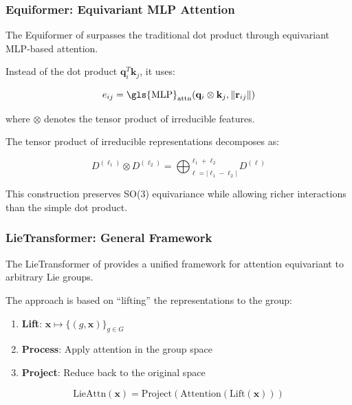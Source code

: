 \subsubsection{Equiformer: Equivariant \gls{MLP} Attention}

The Equiformer of \citet{liao2022equiformer} surpasses the traditional dot product through equivariant \gls{MLP}-based attention.

Instead of the dot product $\mathbf{q}_i^T \mathbf{k}_j$, it uses:

\begin{equation}
    e_{ij} = \text{\gls{MLP}}_{\text{attn}}(\mathbf{q}_i \otimes \mathbf{k}_j, \|\mathbf{r}_{ij}\|)
    \label{eq:equiformer_attention_scores}
\end{equation}

where $\otimes$ denotes the tensor product of irreducible features.

The tensor product of irreducible representations decomposes as:

\begin{equation}
    D^{(\ell_1)} \otimes D^{(\ell_2)} = \bigoplus_{\ell=|\ell_1-\ell_2|}^{\ell_1+\ell_2} D^{(\ell)}
    \label{eq:tensor_product_decomposition}
\end{equation}

This construction preserves SO(3) equivariance while allowing richer interactions than the simple dot product.

\subsubsection{Lie\gls{Transformer}: General Framework}

The Lie\gls{Transformer} of \citet{hutchinson2020lietransformer} provides a unified framework for attention equivariant to arbitrary Lie groups.

The approach is based on ``lifting'' the representations to the group:

\begin{enumerate}
    \item \textbf{Lift}: $\mathbf{x} \mapsto \{(g, \mathbf{x})\}_{g \in G}$
    \item \textbf{Process}: Apply attention in the group space
    \item \textbf{Project}: Reduce back to the original space
\end{enumerate}

\begin{equation}
    \text{LieAttn}(\mathbf{x}) = \text{Project}(\text{Attention}(\text{Lift}(\mathbf{x})))
    \label{eq:lie_attention}
\end{equation}

